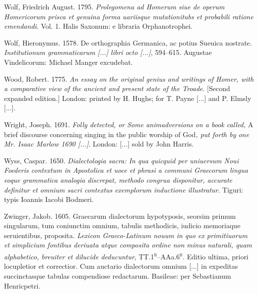 \begin{styleStandard}
Wolf, Friedrich August. 1795. \textit{Prolegomena ad Homerum siue de operum Homericorum prisca et genuina forma uariisque mutationitubs et probabili ratione emendandi}. Vol. 1. Halis Saxonum: e libraria Orphanotrophei.
\end{styleStandard}

\begin{styleStandard}
Wolf, Hieronymus. 1578. De orthographia Germanica, ac potius Sueuica nostrate. \textit{Institutionum grammaticarum [...] libri octo [...]}, 594–615. Augustae Vindelicorum: Michael Manger excudebat.
\end{styleStandard}

\begin{styleStandard}
Wood, Robert. 1775. \textit{An essay on the original genius and writings of Homer, with a comparative view of the ancient and present state of the Troade}. [Second expanded edition.] London: printed by H. Hughs; for T. Payne [...] and P. Elmsly [...].
\end{styleStandard}

\begin{styleStandard}
Wright, Joseph. 1691. \textit{Folly detected, or Some animadversions on a book called, }A brief discourse concerning singing in the public worship of God\textit{, put forth by one Mr. Isaac Marlow 1690 [...]}. London: [...] sold by John Harris.
\end{styleStandard}

\begin{styleStandard}
Wyss, Caspar. 1650. \textit{Dialectologia sacra: In qua quicquid per uniuersum Noui Foederis contextum in Apostolica et uoce et phrasi a communi Graecorum lingua eoque grammatica analogia discrepat, methodo congrua disponitur, accurate definitur et omnium sacri contextus exemplorum inductione illustratur}. Tiguri: typis Ioannis Iacobi Bodmeri.
\end{styleStandard}

\begin{styleStandard}
Zwinger, Jakob. 1605. Graecarum dialectorum hypotyposis, seorsim primum singularum, tum coniunctim omnium, tabulis methodicis, iudicio memoriaque seruientibus, proposita. \textit{Lexicon Graeco-Latinum nouum in quo ex primitiuorum et simplicium fontibus deriuata atque composita ordine non minus naturali, quam alphabetico, breuiter et dilucide deducuntur}, TT.1\textsc{\textsuperscript{r}}–AAa.6\textsc{\textsuperscript{r}}. Editio ultima, priori locupletior et correctior. Cum auctario dialectorum omnium [...] in expeditas succinctasque tabulas compendiose redactarum. Basileae: per Sebastianum Henricpetri.
\end{styleStandard}

